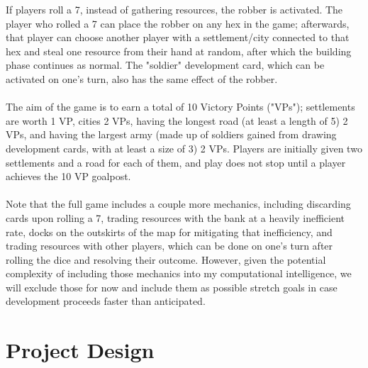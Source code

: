 \documentclass[a4paper, 11pt]{article}
\begin{document}
\noindent If players roll a 7, instead of gathering resources, the robber is activated. The player who rolled a 7 can place the robber on any hex in the game; afterwards, that player can choose another player with a settlement/city connected to that hex and steal one resource from their hand at random, after which the building phase continues as normal. The "soldier" development card, which can be activated on one's turn, also has the same effect of the robber.
\\ \\
\noindent The aim of the game is to earn a total of 10 Victory Points ("VPs"); settlements are worth 1 VP, cities 2 VPs, having the longest road (at least a length of 5) 2 VPs, and having the largest army (made up of soldiers gained from drawing development cards, with at least a size of 3) 2 VPs. Players are initially given two settlements and a road for each of them, and play does not stop until a player achieves the 10 VP goalpost.
\\ \\
\noindent Note that the full game includes a couple more mechanics, including discarding cards upon rolling a 7, trading resources with the bank at a heavily inefficient rate, docks on the outskirts of the map for mitigating that inefficiency, and trading resources with other players, which can be done on one's turn after rolling the dice and resolving their outcome. However, given the potential complexity of including those mechanics into my computational intelligence, we will exclude those for now and include them as possible stretch goals in case development proceeds faster than anticipated.

\section{Project Design}
\end{document}
